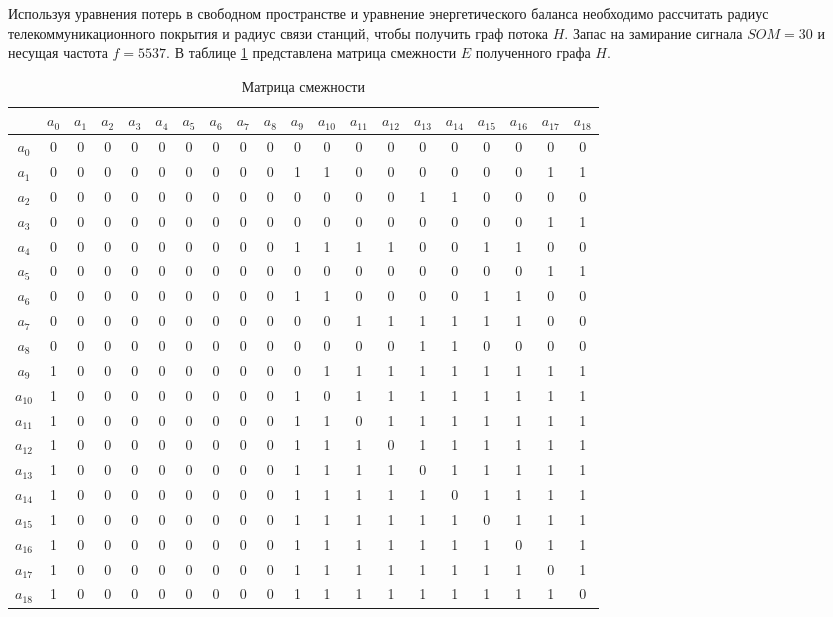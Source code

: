 Используя уравнения потерь в свободном пространстве и уравнение энергетического баланса необходимо рассчитать радиус телекоммуникационного покрытия и радиус связи станций, чтобы получить граф потока $H$. Запас на замирание сигнала $SOM = 30$ и несущая частота $f=5537$. В таблице \cref{tab:part3_mip_adj_mat} представлена матрица смежности $E$ полученного графа $H$.


\begin{table}[hbt!]
    \tiny
    \begin{tabular}{| c|| c| c c c c c c c c| c c c c c c c c c c|}

    \hline

    &$a_0$ &$a_1$ &$a_2$ &$a_3$ &$a_4$ &$a_5$ &$a_6$ &$a_7$ &$a_8$ &$a_9$& $a_{10}$&$a_{11}$&$a_{12}$& $a_{13}$& $a_{14}$& $a_{15}$& $a_{16}$& $a_{17}$& $a_{18}$  \\
    \hline \hline
    $a_0$ & 0 &0 &0 &0 &0 &0 &0 &0 &0 &0 &0 &0 &0 &0 &0 &0 &0 &0 &0  \\
    \hline
    $a_1$ & 0 &0 &0 &0 &0 &0 &0 &0 &0 &1 &1 &0 &0 &0 &0 &0 &0 &1 &1  \\
    $a_2$ & 0 &0 &0 &0 &0 &0 &0 &0 &0 &0 &0 &0 &0 &1 &1 &0 &0 &0 &0  \\
    $a_3$ & 0 &0 &0 &0 &0 &0 &0 &0 &0 &0 &0 &0 &0 &0 &0 &0 &0 &1 &1  \\
    $a_4$ & 0 &0 &0 &0 &0 &0 &0 &0 &0 &1 &1 &1 &1 &0 &0 &1 &1 &0 &0  \\
    $a_5$ & 0 &0 &0 &0 &0 &0 &0 &0 &0 &0 &0 &0 &0 &0 &0 &0 &0 &1 &1  \\
    $a_6$ & 0 &0 &0 &0 &0 &0 &0 &0 &0 &1 &1 &0 &0 &0 &0 &1 &1 &0 &0  \\
    $a_7$ & 0 &0 &0 &0 &0 &0 &0 &0 &0 &0 &0 &1 &1 &1 &1 &1 &1 &0 &0  \\
    $a_8$ & 0 &0 &0 &0 &0 &0 &0 &0 &0 &0 &0 &0 &0 &1 &1 &0 &0 &0 &0  \\
    \hline
    $a_9$ & 1 &0 &0 &0 &0 &0 &0 &0 &0 &0 &1 &1 &1 &1 &1 &1 &1 &1 &1  \\
    $a_{10}$ & 1 &0 &0 &0 &0 &0 &0 &0 &0 &1 &0 &1 &1 &1 &1 &1 &1 &1 &1  \\
    $a_{11}$ & 1 &0 &0 &0 &0 &0 &0 &0 &0 &1 &1 &0 &1 &1 &1 &1 &1 &1 &1  \\
    $a_{12}$ & 1 &0 &0 &0 &0 &0 &0 &0 &0 &1 &1 &1 &0 &1 &1 &1 &1 &1 &1  \\
    $a_{13}$ & 1 &0 &0 &0 &0 &0 &0 &0 &0 &1 &1 &1 &1 &0 &1 &1 &1 &1 &1  \\
    $a_{14}$ & 1 &0 &0 &0 &0 &0 &0 &0 &0 &1 &1 &1 &1 &1 &0 &1 &1 &1 &1  \\
    $a_{15}$ & 1 &0 &0 &0 &0 &0 &0 &0 &0 &1 &1 &1 &1 &1 &1 &0 &1 &1 &1  \\
    $a_{16}$ & 1 &0 &0 &0 &0 &0 &0 &0 &0 &1 &1 &1 &1 &1 &1 &1 &0 &1 &1  \\
    $a_{17}$ & 1 &0 &0 &0 &0 &0 &0 &0 &0 &1 &1 &1 &1 &1 &1 &1 &1 &0 &1  \\
    $a_{18}$ & 1 &0 &0 &0 &0 &0 &0 &0 &0 &1 &1 &1 &1 &1 &1 &1 &1 &1 &0  \\
    \hline
    \end{tabular}\caption{Матрица смежности}\label{tab:part3_mip_adj_mat}
\end{table}


